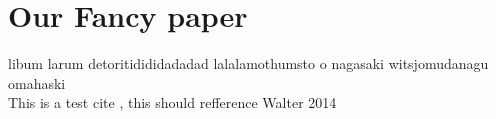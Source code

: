 \chapter{Our Fancy paper}
libum larum detoritidididadadad lalalamothumsto o nagasaki witsjomudanagu omahaski \\
This is a test cite \cite{Walter:2014}, this should refference Walter 2014